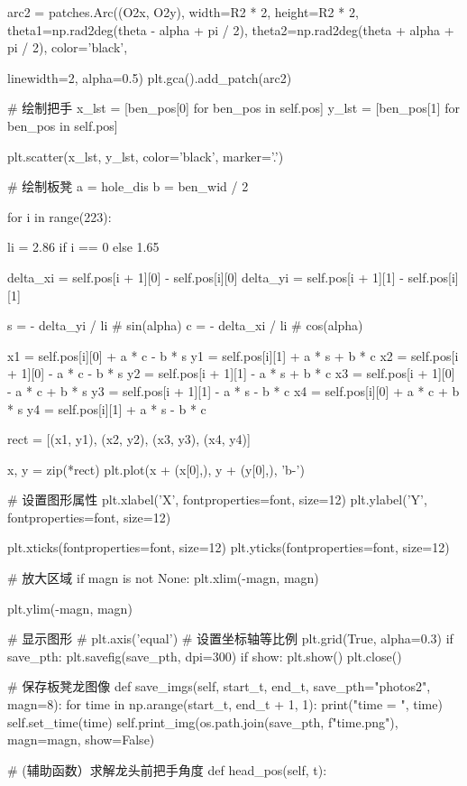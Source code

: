 \documentclass[withoutpreface,bwprint]{cumcmthesis}
\begin{document}
\begin{CodeText}
   arc2 = patches.Arc((O2x, O2y), width=R2 * 2, height=R2 * 2, theta1=np.rad2deg(theta -
             alpha + pi / 2), theta2=np.rad2deg(theta + alpha + pi / 2), color='black',

          linewidth=2, alpha=0.5)
plt.gca().add_patch(arc2)

# 绘制把手
x_lst = [ben_pos[0] for ben_pos in self.pos]
y_lst = [ben_pos[1] for ben_pos in self.pos]

plt.scatter(x_lst, y_lst, color='black', marker='.')

# 绘制板凳
a = hole_dis
b = ben_wid / 2

for i in range(223):

   li = 2.86 if i == 0 else 1.65

   delta_xi = self.pos[i + 1][0] - self.pos[i][0]
   delta_yi = self.pos[i + 1][1] - self.pos[i][1]

   s = - delta_yi / li # sin(alpha)
   c = - delta_xi / li # cos(alpha)

   x1 = self.pos[i][0] + a * c - b * s
   y1 = self.pos[i][1] + a * s + b * c
   x2 = self.pos[i + 1][0] - a * c - b * s
   y2 = self.pos[i + 1][1] - a * s + b * c
   x3 = self.pos[i + 1][0] - a * c + b * s
   y3 = self.pos[i + 1][1] - a * s - b * c
   x4 = self.pos[i][0] + a * c + b * s
   y4 = self.pos[i][1] + a * s - b * c

   rect = [(x1, y1), (x2, y2), (x3, y3), (x4, y4)]

   x, y = zip(*rect)
   plt.plot(x + (x[0],), y + (y[0],), 'b-')

# 设置图形属性
plt.xlabel('X', fontproperties=font, size=12)
plt.ylabel('Y', fontproperties=font, size=12)

plt.xticks(fontproperties=font, size=12)
plt.yticks(fontproperties=font, size=12)

# 放大区域
if magn is not None:
   plt.xlim(-magn, magn)

      plt.ylim(-magn, magn)

   # 显示图形
   # plt.axis('equal') # 设置坐标轴等比例
   plt.grid(True, alpha=0.3)
   if save_pth:
      plt.savefig(save_pth, dpi=300)
   if show:
      plt.show()
   plt.close()

# 保存板凳龙图像
def save_imgs(self, start_t, end_t, save_pth="photos2", magn=8):
   for time in np.arange(start_t, end_t + 1, 1):
      print("time = ", time)
      self.set_time(time)
      self.print_img(os.path.join(save_pth, f"{time}.png"), magn=magn, show=False)

# (辅助函数）求解龙头前把手角度
def head_pos(self, t):


\end{CodeText}
\end{document}
